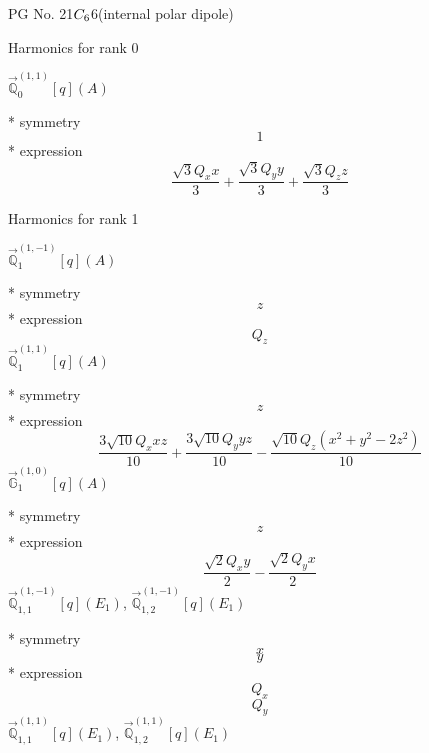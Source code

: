 \documentclass[fleqn,8pt]{jsarticle}
\begin{document}
\setcounter{MaxMatrixCols}{32}

\renewcommand{\tablename}{Table~}
\renewcommand{\figurename}{Figure~}
\begin{center}
\LARGE
PG No. 21\quad$C_{\rm 6}$\quad$6$\quad[ hexagonal ] (internal polar dipole)
\end{center}

\noindent * Harmonics for rank 0

\noindent\quad $\vec{\mathbb{Q}}_{0}^{(1,1)}[q](A)$

\noindent\quad ** symmetry
\begin{dmath*}
1
\end{dmath*}
\noindent\quad ** expression
\begin{dmath*}
\frac{\sqrt{3} Q_{x} x}{3} + \frac{\sqrt{3} Q_{y} y}{3} + \frac{\sqrt{3} Q_{z} z}{3}
\end{dmath*}

\noindent * Harmonics for rank 1

\noindent\quad $\vec{\mathbb{Q}}_{1}^{(1,-1)}[q](A)$

\noindent\quad ** symmetry
\begin{dmath*}
z
\end{dmath*}
\noindent\quad ** expression
\begin{dmath*}
Q_{z}
\end{dmath*}
\noindent\quad $\vec{\mathbb{Q}}_{1}^{(1,1)}[q](A)$

\noindent\quad ** symmetry
\begin{dmath*}
z
\end{dmath*}
\noindent\quad ** expression
\begin{dmath*}
\frac{3 \sqrt{10} Q_{x} x z}{10} + \frac{3 \sqrt{10} Q_{y} y z}{10} - \frac{\sqrt{10} Q_{z} \left(x^{2} + y^{2} - 2 z^{2}\right)}{10}
\end{dmath*}
\noindent\quad $\vec{\mathbb{G}}_{1}^{(1,0)}[q](A)$

\noindent\quad ** symmetry
\begin{dmath*}
z
\end{dmath*}
\noindent\quad ** expression
\begin{dmath*}
\frac{\sqrt{2} Q_{x} y}{2} - \frac{\sqrt{2} Q_{y} x}{2}
\end{dmath*}
\noindent\quad $\vec{\mathbb{Q}}_{1,1}^{(1,-1)}[q](E_{1})$, $\vec{\mathbb{Q}}_{1,2}^{(1,-1)}[q](E_{1})$

\noindent\quad ** symmetry
\begin{dmath*}
x
\end{dmath*}
\begin{dmath*}
y
\end{dmath*}
\noindent\quad ** expression
\begin{dmath*}
Q_{x}
\end{dmath*}
\begin{dmath*}
Q_{y}
\end{dmath*}
\noindent\quad $\vec{\mathbb{Q}}_{1,1}^{(1,1)}[q](E_{1})$, $\vec{\mathbb{Q}}_{1,2}^{(1,1)}[q](E_{1})$
\end{document}

